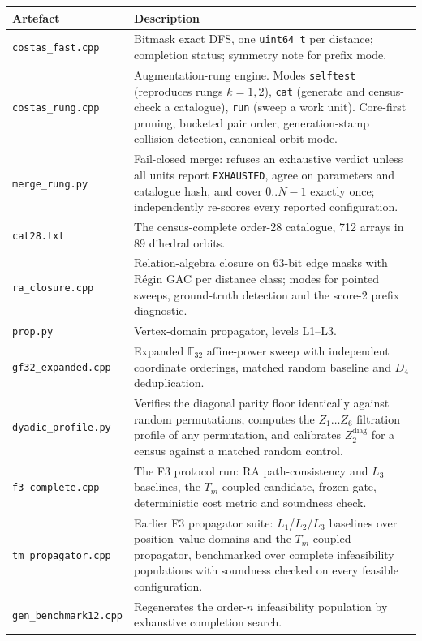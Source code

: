\documentclass[11pt,a4paper]{article}
\theoremstyle{definition}
\newcommand{\F}{\mathbb{F}}
\begin{document}
\begin{longtable}{@{}l p{}@{}}
\toprule
Artefact & Description \\
\midrule
\endhead
\texttt{costas\_fast.cpp} & Bitmask exact DFS, one \texttt{uint64\_t} per
  distance; completion status; symmetry note for prefix mode. \\
\texttt{costas\_rung.cpp} & Augmentation-rung engine. Modes \texttt{selftest}
  (reproduces rungs $k=1,2$), \texttt{cat} (generate and census-check a
  catalogue), \texttt{run} (sweep a work unit). Core-first pruning, bucketed
  pair order, generation-stamp collision detection, canonical-orbit mode. \\
\texttt{merge\_rung.py} & Fail-closed merge: refuses an exhaustive verdict unless
  all units report \texttt{EXHAUSTED}, agree on parameters and catalogue hash,
  and cover $0..N{-}1$ exactly once; independently re-scores every reported
  configuration. \\
\texttt{cat28.txt} & The census-complete order-28 catalogue, 712 arrays in 89
  dihedral orbits. \\
\texttt{ra\_closure.cpp} & Relation-algebra closure on 63-bit edge masks with
  Régin GAC per distance class; modes for pointed sweeps, ground-truth detection
  and the score-2 prefix diagnostic. \\
\texttt{prop.py} & Vertex-domain propagator, levels L1--L3. \\
\texttt{gf32\_expanded.cpp} & Expanded $\F_{32}$ affine-power sweep with
  independent coordinate orderings, matched random baseline and $D_4$
  deduplication. \\
\texttt{dyadic\_profile.py} & Verifies the diagonal parity floor identically
  against random permutations, computes the $Z_1\ldots Z_6$ filtration profile of
  any permutation, and calibrates $Z_2^{\mathrm{diag}}$ for a census against a
  matched random control. \\
\texttt{f3\_complete.cpp} & The F3 protocol run: RA path-consistency and $L_3$ baselines, the $T_m$-coupled candidate, frozen gate, deterministic cost metric and soundness check. \\
\texttt{tm\_propagator.cpp} & Earlier F3 propagator suite: $L_1$/$L_2$/$L_3$
  baselines over position--value domains and the $T_m$-coupled propagator,
  benchmarked over complete infeasibility populations with soundness checked on
  every feasible configuration. \\
\texttt{gen\_benchmark12.cpp} & Regenerates the order-$n$ infeasibility
  population by exhaustive completion search. \\

\end{longtable}
\end{document}
